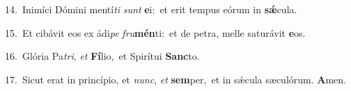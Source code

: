 {\numbfont\textcolor{\numbcolor}{14.}}~Inimíci Dómini mentí\textit{ti} \textit{sunt} \textbf{e}\-i:~\star et erit tempus eórum in \textbf{sǽ}\-cula.\par
{\numbfont\textcolor{\numbcolor}{15.}}~Et cibávit eos ex ádi\textit{pe} \textit{fru}\-\textbf{mén}ti:~\star et de petra, melle saturávit \textbf{e}\-os.\par
{\numbfont\textcolor{\numbcolor}{16.}}~Glória Pa\-\textit{tri}\-, \textit{et} \textbf{Fí}\-lio,~\star et Spirítui \textbf{Sanc}\-to.\par
{\numbfont\textcolor{\numbcolor}{17.}}~Sicut erat in princípio, et \textit{nunc}\-, \textit{et} \textbf{sem}\-per,~\star et in sǽcula sæculórum. \textbf{A}\-men.\par

